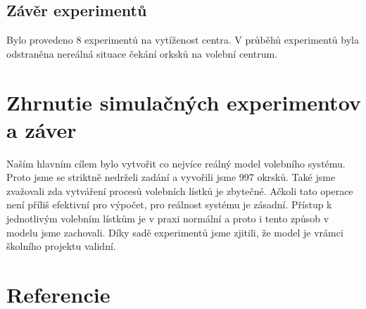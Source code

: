 \documentclass[12pt,a4paper,titlepage,final]{article}
\begin{document}
\subsection{Závěr experimentů}
Bylo provedeno 8 experimentů na vytíženost centra. V průběhů experimentů byla odstraněna nereálná situace čekání orksků na volební centrum.


\section{Zhrnutie simulačných experimentov a záver}
Naším hlavním cílem bylo vytvořit co nejvíce reálný model volebního systému. Proto jsme se striktně nedrželi zadání a vyvořili jsme 997 okrsků. Také jsme zvažovali zda vytváření procesů volebních lístků je zbytečné. Ačkoli tato operace není příliš efektivní pro výpočet, pro reálnost systému je zásadní. Přístup k jednotlivým volebním lístkům je v praxi normální a proto i tento způsob v modelu jsme zachovali.\newline
Díky sadě experimentů jsme zjitili, že model je vrámci školního projektu validní.


\newpage

\section{Referencie}





\newpage
\end{document}
